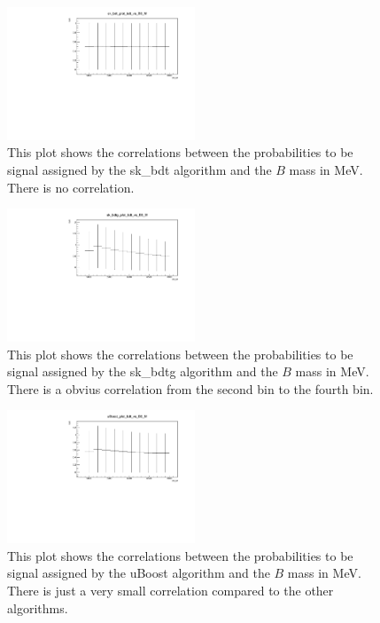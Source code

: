 \documentclass[english]{uzhpub}
\begin{document}
 \begin{figure}[H]
  \centering
  \includegraphics[width=0.5\textwidth]{plots/sk_bdt_plot_bdt_vs_B0_M}
  \caption{This plot shows the correlations between the probabilities to be signal assigned by the sk\_bdt algorithm and the $B$ mass in MeV. There is no correlation.}
  \label{fig:skbdtB0M}
 \end{figure}

 \begin{figure}[H]
  \centering
  \includegraphics[width=0.5\textwidth]{plots/sk_bdtg_plot_bdt_vs_B0_M}
  \caption{This plot shows the correlations between the probabilities to be signal assigned by the sk\_bdtg algorithm and the $B$ mass in MeV. There is a obvius correlation from the second bin to the fourth bin.}
  \label{fig:skbdtgB0M}
 \end{figure}

 \begin{figure}[H]
  \centering
  \includegraphics[width=0.5\textwidth]{plots/uBoost_plot_bdt_vs_B0_M}
  \caption{This plot shows the correlations between the probabilities to be signal assigned by the uBoost algorithm and the $B$ mass in MeV. There is just a very small correlation compared to the other algorithms.}
  \label{fig:uBoostB0M}
 \end{figure}
\end{document}
